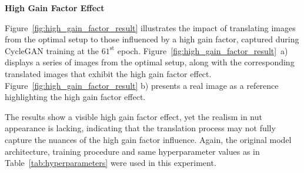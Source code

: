 \documentclass[12pt,DIV14,BCOR12mm,a4paper,footinclude=false,headinclude,parskip=half-,twoside,openright,cleardoublepage=empty,toc=index,bibliography=totoc,listof=totoc]{scrreprt}
\numberwithin{equation}{chapter}
\begin{document}
\newpage

\textbf{High Gain Factor Effect}

Figure~\ref{fig:high_gain_factor_result} illustrates the impact of translating images from the optimal setup to those influenced by a high gain factor, captured during CycleGAN training at the \( 61^{\text{st}} \) epoch. Figure~\ref{fig:high_gain_factor_result}~a) displays a series of images from the optimal setup, along with the corresponding translated images that exhibit the high gain factor effect. Figure~\ref{fig:high_gain_factor_result} b) presents a real image as a reference highlighting the high gain factor effect. 

The results show a visible high gain factor effect, yet the realism in nut appearance is lacking, indicating that the translation process may not fully capture the nuances of the high gain factor influence. Again, the original model architecture, training procedure and same hyperparameter values as in Table~\ref{tab:hyperparameters} were used in this experiment.
\end{document}

